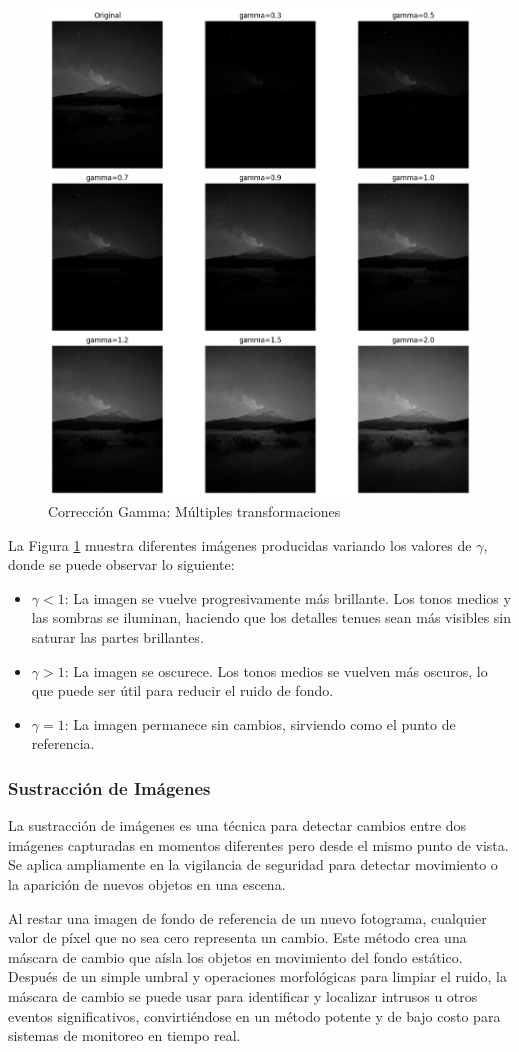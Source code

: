 \documentclass[12pt,letterpaper]{article}
\begin{document}
\begin{figure}[H]
  \centering
  \includegraphics[width=0.5\linewidth]{figuras/correccion_gamma.png}
  \caption{Corrección Gamma: Múltiples transformaciones}
  \label{fig:correccion_gamma}
\end{figure}

La Figura \ref{fig:correccion_gamma} muestra diferentes imágenes producidas variando los valores de $\gamma$, donde se puede observar lo siguiente:

\begin{itemize}
  \item \textbf{$\gamma < 1$}: La imagen se vuelve progresivamente más brillante. Los tonos medios y las sombras se iluminan, haciendo que los detalles tenues sean más visibles sin saturar las partes brillantes.
  \item \textbf{$\gamma > 1$}: La imagen se oscurece. Los tonos medios se vuelven más oscuros, lo que puede ser útil para reducir el ruido de fondo.
  \item \textbf{$\gamma = 1$}: La imagen permanece sin cambios, sirviendo como el punto de referencia.
\end{itemize}

\subsubsection{Sustracción de Imágenes}

La sustracción de imágenes es una técnica para detectar cambios entre dos imágenes capturadas en momentos diferentes pero desde el mismo punto de vista. Se aplica ampliamente en la vigilancia de seguridad para detectar movimiento o la aparición de nuevos objetos en una escena.

Al restar una imagen de fondo de referencia de un nuevo fotograma, cualquier valor de píxel que no sea cero representa un cambio. Este método crea una máscara  de cambio que aísla los objetos en movimiento del fondo estático. Después de un simple umbral y operaciones morfológicas para limpiar el ruido, la máscara de cambio se puede usar para identificar y localizar intrusos u otros eventos significativos, convirtiéndose en un método potente y de bajo costo para sistemas de monitoreo en tiempo real.
\end{document}
